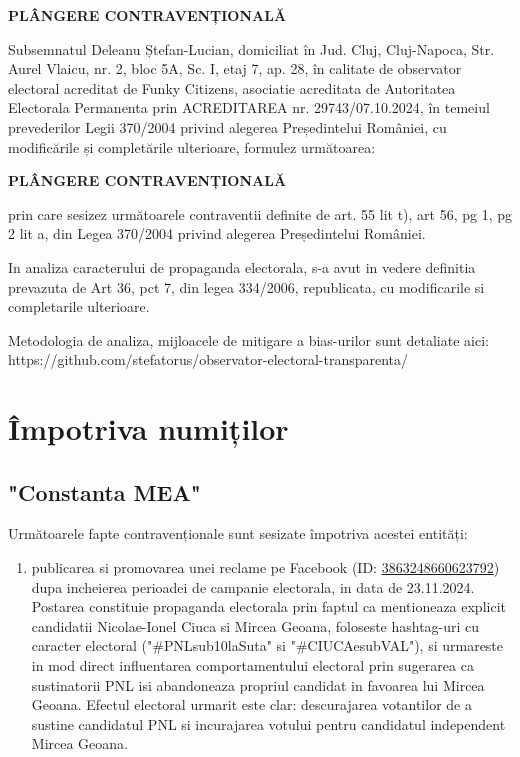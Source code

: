 \documentclass[a4paper,12pt]{article}
\begin{document}
\begin{center}
    \Large\textbf{PLÂNGERE CONTRAVENȚIONALĂ}
\end{center}

\vspace{1cm}

Subsemnatul Deleanu Ștefan-Lucian, domiciliat în Jud. Cluj, Cluj-Napoca, Str. Aurel Vlaicu, nr. 2, bloc 5A, Sc. I, etaj 7, ap. 28, în calitate de observator electoral acreditat de Funky Citizens, asociatie acreditata de Autoritatea Electorala Permanenta prin ACREDITAREA nr. 29743/07.10.2024, în temeiul prevederilor Legii 370/2004 privind alegerea Președintelui României, cu modificările și completările ulterioare, formulez următoarea:

\vspace{0.5cm}
\begin{center}
\textbf{\Large PLÂNGERE CONTRAVENȚIONALĂ}
\end{center}
\vspace{0.5cm}

prin care sesizez următoarele contraventii definite de art. 55 lit t), art 56, pg 1, pg 2 lit a, din Legea 370/2004 privind alegerea Președintelui României.

In analiza caracterului de propaganda electorala, s-a avut in vedere definitia prevazuta de Art 36, pct 7, din legea 334/2006, republicata, cu modificarile si completarile ulterioare.

Metodologia de analiza, mijloacele de mitigare a bias-urilor sunt detaliate aici:
https://github.com/stefatorus/observator-electoral-transparenta/

\newpage
\tableofcontents
\newpage

\section{Împotriva numiților}

\subsection{"Constanta MEA"}
Următoarele fapte contravenționale sunt sesizate împotriva acestei entități:

\begin{enumerate}[leftmargin=*, label=\arabic*.)]
    \item publicarea si promovarea unei reclame pe Facebook (ID: \href{https://www.facebook.com/ads/library/?id=3863248660623792}{3863248660623792}) dupa incheierea perioadei de campanie electorala, in data de 23.11.2024. Postarea constituie propaganda electorala prin faptul ca mentioneaza explicit candidatii Nicolae-Ionel Ciuca si Mircea Geoana, foloseste hashtag-uri cu caracter electoral ("\#PNLsub10laSuta" si "\#CIUCAesubVAL"), si urmareste in mod direct influentarea comportamentului electoral prin sugerarea ca sustinatorii PNL isi abandoneaza propriul candidat in favoarea lui Mircea Geoana. Efectul electoral urmarit este clar: descurajarea votantilor de a sustine candidatul PNL si incurajarea votului pentru candidatul independent Mircea Geoana.
\end{enumerate}
\end{document}
